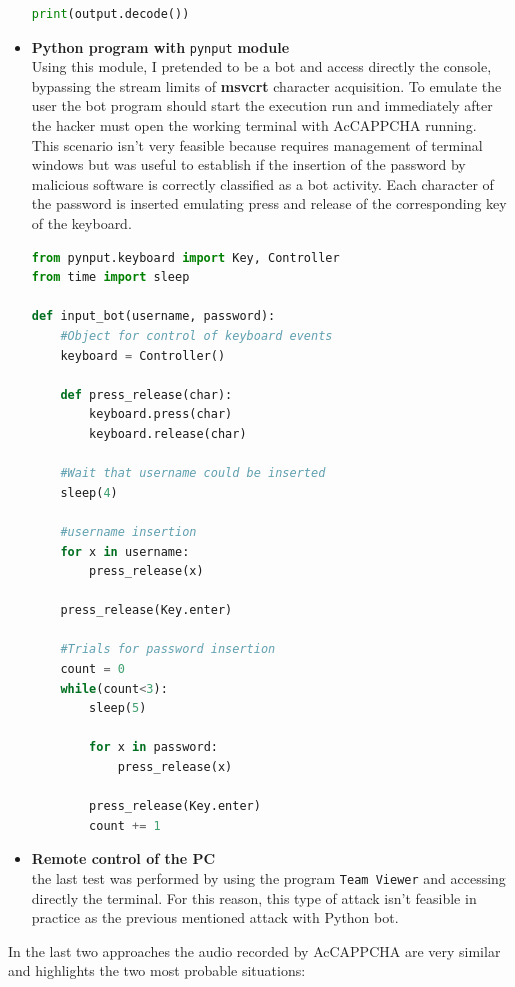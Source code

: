\begin{itemize}
{\begin{lstlisting}[language=python, showstringspaces=false, tabsize=4, basicstyle=\footnotesize, caption={\footnotesize{Bot using popen.}},label={Results:popen_bot}]
    print(output.decode())
\end{lstlisting}
}
\item{\textbf{Python program with} \texttt{pynput} \textbf{module}\\
Using this module, I pretended to be a bot and access directly the console, bypassing the stream limits of \textbf{msvcrt} character acquisition. To emulate the user the bot program should start the execution run and immediately after the hacker must open the working terminal with AcCAPPCHA running.\\
This scenario isn't very feasible because requires management of terminal windows but was useful to establish if the insertion of the password by malicious software is correctly classified as a bot activity. Each character of the password is inserted emulating press and release of the corresponding key of the keyboard.
\begin{lstlisting}[language=python, showstringspaces=false, tabsize=4, basicstyle=\footnotesize, caption={\footnotesize{Bot using pynput module.}},label={Results:pynput_bot}]
from pynput.keyboard import Key, Controller
from time import sleep

def input_bot(username, password):
    #Object for control of keyboard events
    keyboard = Controller()

    def press_release(char):
        keyboard.press(char)
        keyboard.release(char)

    #Wait that username could be inserted
    sleep(4)

    #username insertion
    for x in username:
        press_release(x)
    
    press_release(Key.enter)

    #Trials for password insertion
    count = 0
    while(count<3):
        sleep(5)
        
        for x in password:
            press_release(x)

        press_release(Key.enter)
        count += 1
\end{lstlisting}
}
\item{\textbf{Remote control of the PC}\\
the last test was performed by using the program \texttt{Team Viewer} and accessing directly the terminal. For this reason, this type of attack isn't feasible in practice as the previous mentioned attack with Python bot.}
\end{itemize}
In the last two approaches the audio recorded by AcCAPPCHA are very similar and highlights the two most probable situations:
